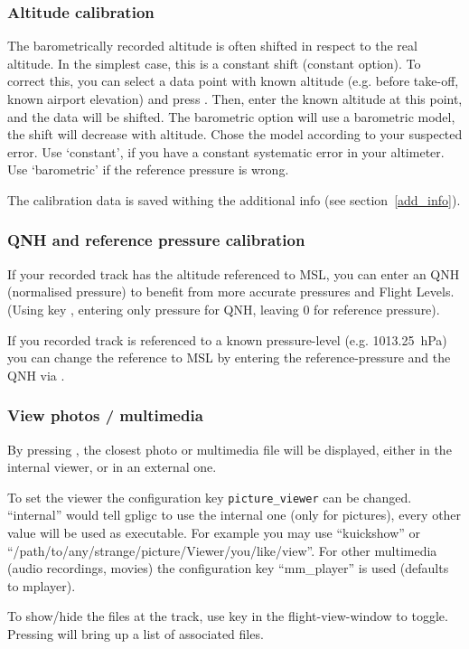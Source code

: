 \subsubsection{Altitude calibration}
The barometrically recorded altitude is often shifted in respect to the real altitude.
In the simplest case, this is a constant shift (constant option).
To correct this, you can select a data point with known altitude
(e.g. before take-off, known airport elevation) and press .
Then, enter the known altitude at this point, and the data will be shifted.
The barometric option will use a barometric model, the shift will decrease with altitude.
Chose the model according to your suspected error. Use `constant', if you have a constant systematic error in your altimeter.
Use `barometric' if the reference pressure is wrong.

The calibration data is saved withing the additional info (see section~\ref{add_info}).


\subsubsection{QNH and reference pressure calibration}
If your recorded track has the altitude referenced to MSL, you can enter an QNH (normalised pressure) to benefit from more accurate pressures and Flight Levels.
(Using key , entering only pressure for QNH, leaving 0 for reference pressure).

If you recorded track is referenced to a known pressure-level (e.g. 1013.25~hPa) you can change the reference to MSL by entering the reference-pressure and the QNH via .


\subsubsection{View photos / multimedia}
By pressing , the closest photo or multimedia file will be displayed, either in
the internal viewer, or in an external one.

To set the viewer the configuration key \texttt{picture\_viewer} can be changed. ``internal'' would tell
gpligc to use the internal one (only for pictures), every other value will be used as executable. For example you may use
``kuickshow'' or ``/path/to/any/strange/picture/Viewer/you/like/view''.
For other multimedia (audio recordings, movies) the configuration key ``mm\_player'' is used (defaults to mplayer).

To show/hide the files at the track, use key  in the flight-view-window to toggle. Pressing  will bring up a list of associated files.

